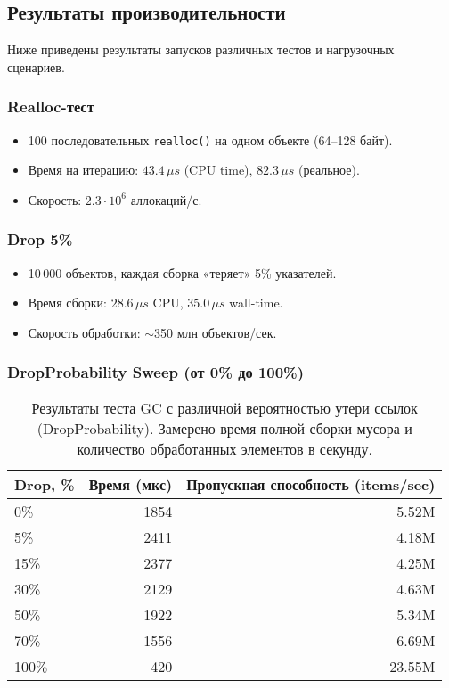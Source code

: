 \subsection{Результаты производительности}

Ниже приведены результаты запусков различных тестов и нагрузочных сценариев.

\subsubsection*{Realloc-тест}

\begin{itemize}
    \item 100 последовательных \texttt{realloc()} на одном объекте (64–128 байт).
    \item Время на итерацию: $43.4\,\mu s$ (CPU time), $82.3\,\mu s$ (реальное).
    \item Скорость: $2.3 \cdot 10^6$ аллокаций/с.
\end{itemize}

\subsubsection*{Drop 5\%}

\begin{itemize}
    \item 10\,000 объектов, каждая сборка «теряет» 5\% указателей.
    \item Время сборки: $28.6\,\mu s$ CPU, $35.0\,\mu s$ wall-time.
    \item Скорость обработки: $\sim$350 млн объектов/сек.
\end{itemize}

\subsubsection*{DropProbability Sweep (от 0\% до 100\%)}

\begin{table}[ht]
    \caption{Результаты теста GC с различной вероятностью утери ссылок (DropProbability). Замерено время полной сборки мусора и количество обработанных элементов в секунду.}
    \label{table:drop_probability}
    \footnotesize
    \centering
    \begin{tabular}{lrr}
        \toprule
        \textbf{Drop, \%} & \textbf{Время (мкс)} & \textbf{Пропускная способность (items/sec)} \\
        \midrule
        0\%   & 1854 & 5.52M \\
        5\%   & 2411 & 4.18M \\
        15\%  & 2377 & 4.25M \\
        30\%  & 2129 & 4.63M \\
        50\%  & 1922 & 5.34M \\
        70\%  & 1556 & 6.69M \\
        100\% & 420  & 23.55M \\
        \bottomrule
    \end{tabular}
\end{table}

